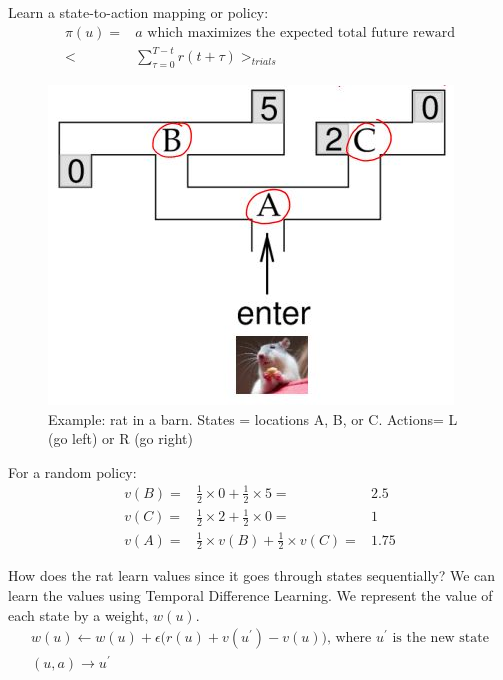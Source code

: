 \documentclass[]{article}
\begin{document}
Learn a state-to-action mapping or policy:
\begin{align*}
	\pi(u) =& a \text{ which maximizes the expected total future reward}\\
	\Big<&\sum_{\tau=0}^{T-t}r(t+\tau)\Big>_{trials}
\end{align*}

\begin{figure}[H]
	\begin{center}
		\caption[Example: rat in a barn]{Example: rat in a barn. States = locations A, B, or C. Actions= L (go left) or R (go right)}
		\includegraphics[width=\textwidth]{rat-barn-choices-rewards}
	\end{center}
\end{figure}

For a random policy:
\begin{align*}
	v(B) =&\frac{1}{2}\times 0 + \frac{1}{2}\times 5 =& 2.5\\
	v(C) =&\frac{1}{2}\times 2 + \frac{1}{2}\times 0 =& 1\\
	v(A) =&\frac{1}{2}\times v(B) + \frac{1}{2}\times v(C) =& 1.75
\end{align*}

How does the rat learn values since it goes through states sequentially? We can learn the values using Temporal Difference Learning. We represent the value of each state by a weight, $w(u)$.
\begin{align*}
	w(u) \leftarrow w(u) + \epsilon \big(r(u)+v(u^{\prime})-v(u)\big)\text{, where $u^{\prime}$ is the new state}\\
	(u,a)\rightarrow u^{\prime}	
\end{align*}
\end{document}
